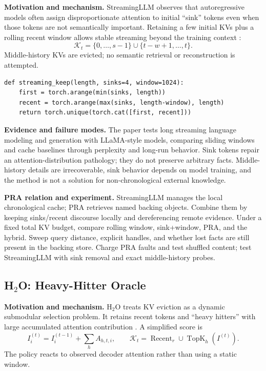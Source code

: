 \textbf{Motivation and mechanism.} StreamingLLM observes that autoregressive models often
assign disproportionate attention to initial ``sink'' tokens even when those tokens are
not semantically important.  Retaining a few initial KVs plus a rolling recent window
allows stable streaming beyond the training context \citep{xiao2023streamingllm}:
\begin{equation}
\mathcal K_t=\{0,\ldots,s-1\}\cup\{t-w+1,\ldots,t\}.
\end{equation}
Middle-history KVs are evicted; no semantic retrieval or reconstruction is attempted.

\begin{lstlisting}[caption={Attention-sink plus rolling-window retention}]
def streaming_keep(length, sinks=4, window=1024):
    first = torch.arange(min(sinks, length))
    recent = torch.arange(max(sinks, length-window), length)
    return torch.unique(torch.cat([first, recent]))
\end{lstlisting}

\textbf{Evidence and failure modes.} The paper tests long streaming language modeling and
generation with LLaMA-style models, comparing sliding windows and cache baselines through
perplexity and long-run behavior.  Sink tokens repair an attention-distribution pathology;
they do not preserve arbitrary facts.  Middle-history details are irrecoverable, sink
behavior depends on model training, and the method is not a solution for non-chronological
external knowledge.

\textbf{PRA relation and experiment.} StreamingLLM manages the local chronological cache;
PRA retrieves named backing objects.  Combine them by keeping sinks/recent discourse locally
and dereferencing remote evidence.  Under a fixed total KV budget, compare rolling window,
sink+window, PRA, and the hybrid.  Sweep query distance, explicit handles, and whether lost
facts are still present in the backing store.  Charge PRA faults and test shuffled content;
test StreamingLLM with sink removal and exact middle-history probes.

\subsection{\texorpdfstring{H$_2$O}{H2O}: Heavy-Hitter Oracle}

\textbf{Motivation and mechanism.} H$_2$O treats KV eviction as a dynamic submodular
selection problem.  It retains recent tokens and ``heavy hitters'' with large accumulated
attention contribution \citep{zhang2023h2o}.  A simplified score is
\begin{equation}
I_i^{(t)}=I_i^{(t-1)}+\sum_h A_{h,t,i},\qquad
\mathcal K_t=\operatorname{Recent}_r\cup\operatorname{TopK}_h(I^{(t)}).
\end{equation}
The policy reacts to observed decoder attention rather than using a static window.

